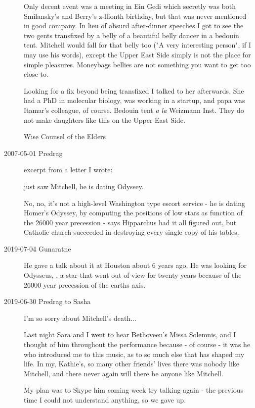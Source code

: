 \begin{description}
Only decent event was a meeting in Ein Gedi which secretly was both
Smilansky's and Berry's z-llionth birthday, but that was never mentioned in
good company. In lieu of absurd after-dinner speeches I got to see the two
gents transfixed by a belly of a beautiful belly dancer in a bedouin tent.
Mitchell would fall for that belly too ("A very interesting person", if I
may use his words), except the Upper East Side simply is not the place for
simple pleasures. Moneybags bellies are not something you want to get too
close to.

Looking for a fix beyond being transfixed I talked to her afterwards. She
had a PhD in molecular biology, was working in a startup, and papa was
Itamar's colleague, of course. Bedouin tent \emph{a la} Weizmann Inst.
They do not make daughters like this on the Upper East Side.

Wise Counsel of the Elders



\item[2007-05-01 Predrag] excerpt from a letter I wrote:

just saw Mitchell, he is dating Odyssey.

No, no, it's not a high-level Washington type escort service - he is
dating Homer's Odyssey, by computing the positions of low stars as
function of the 26000 year precession - says
 {Hipparchus}  had it all
figured out, but Catholic church succeeded in destroying every single
copy of his tables.

\item[2019-07-04 Gunaratne]

He gave a talk about it at Houston about 6 years ago. He was looking for
Odysseus, \ie, a star that went out of view for twenty years because of
the 26000 year precession of the earths axis.

\item[2019-06-30 Predrag to Sasha]

I'm so sorry about Mitchell's death...

Last night Sara and I went to hear Bethoveen's Missa Solemnis, and I
thought of him throughout the performance because - of course - it was he
who introduced me to this music, as to so much else that has shaped my
life. In my, Kathie's, so many other friends' lives there was nobody like
Mitchell, and there never again will there be anyone like Mitchell.

My plan was to Skype him coming week try talking again - the previous
time I could not understand anything, so we gave up.


\end{description}
